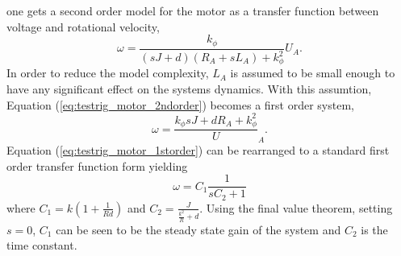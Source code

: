 one gets a second order model for the motor as a transfer function between
voltage and rotational velocity,
\begin{equation} \label{eq:testrig_motor_2ndorder}
    \omega = \frac {k_{\phi}} {(sJ + d)(R_A + sL_A) + k_{\phi}^2} U_A.
\end{equation}
In order to reduce the model complexity, $L_A$ is assumed to be small enough to
have any significant effect on the systems dynamics. With this assumtion,
Equation (\ref{eq:testrig_motor_2ndorder}) becomes a first order system,
\begin{equation} \label{eq:testrig_motor_1storder}
    \omega = \frac {k_{\phi} {sJ + d R_A + k_{\phi}^2}} U_A.
\end{equation}
Equation (\ref{eq:testrig_motor_1storder}) can be rearranged to a standard first
order transfer function form yielding
\begin{equation} \label{eq:testrig_motor_1storder_rewrite}
    \omega = C_1 \frac {1} {s C_2 + 1}
\end{equation}
where $C_1 = k(1 + \frac{1} {R d})$ and $C_2 = \frac {J} {\frac{k^2} {R} + d}$.
Using the final value theorem, setting $s = 0$, $C_1$ can be seen to be the steady
state gain of the system and $C_2$ is the time constant. 


